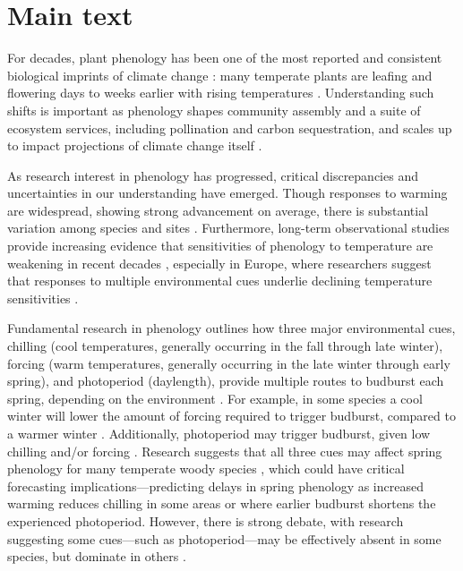 \documentclass{article}
\begin{document}
\section* {Main text}
\par For decades, plant phenology has been one of the most reported and consistent biological imprints of climate change \emph{\citep{IPCC:2014sm}}: many temperate plants are leafing and flowering days to weeks earlier with rising temperatures \emph{\citep{millerrushing2008,menzel2006}}. Understanding such shifts is important as phenology shapes community assembly and a suite of ecosystem services, including pollination and carbon sequestration, and scales up to impact projections of climate change itself \emph{\citep{Cleland:2007or}}.
\par As research interest in phenology has progressed, critical discrepancies and uncertainties in our understanding have emerged. Though responses to warming are widespread, showing strong advancement on average, there is substantial variation among species and sites \emph{\citep{Wolkovich:2012n}}. Furthermore, long-term observational studies provide increasing evidence that sensitivities of phenology to temperature are weakening in recent decades \emph{\citep{Rutishauser:2008,yu2010,wang2019}}, especially in Europe, where researchers suggest that responses to multiple environmental cues underlie declining temperature sensitivities \emph{\citep{fu2015}}. 
\par Fundamental research in phenology outlines how three major environmental cues, chilling (cool temperatures, generally occurring in the fall through late winter), forcing (warm temperatures, generally occurring in the late winter through early spring), and photoperiod (daylength), provide multiple routes to budburst each spring, depending on the environment \emph{\citep{chuine2016}}. For example, in some species a cool winter will lower the amount of forcing required to trigger budburst, compared to a warmer winter \emph{\citep{harrington2015}}. Additionally, photoperiod may trigger budburst, given low chilling and/or forcing \emph{\citep{zohner2016,Basler:2014aa, Caffarra:2011b}}. Research suggests that all three cues may affect spring phenology for many temperate woody species \emph{\citep{flynn2018,Basler:2014aa,Caffarra:2011qf}}, which could have critical forecasting implications---predicting delays in spring phenology as increased warming reduces chilling in some areas \emph{\citep{fraga2019}} or where earlier budburst shortens the experienced photoperiod. However, there is strong debate, with research suggesting some cues---such as photoperiod---may be effectively absent in some species, but dominate in others \emph{\citep{zohner2016,Heide:1993,Basler:2014aa,Singh:2017}}. 
\end{document}
